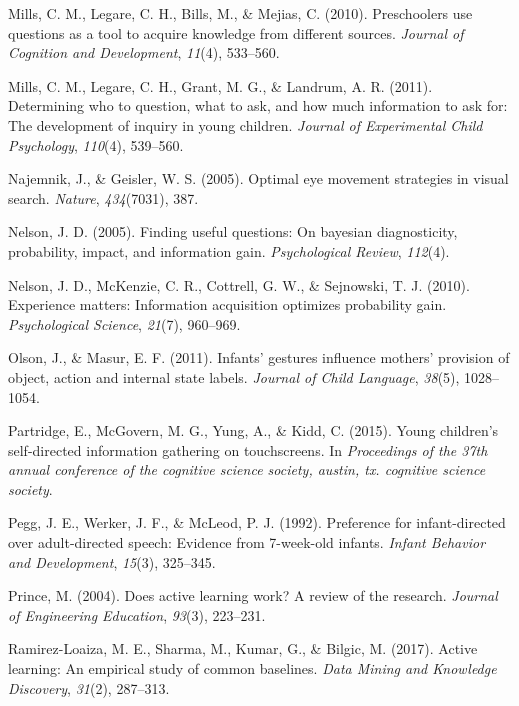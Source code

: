 \documentclass[english,man]{apa6}
\theoremstyle{definition}
\theoremstyle{definition}
\theoremstyle{definition}
\theoremstyle{remark}
\begin{document}
\hypertarget{ref-mills2010preschoolers}{}
Mills, C. M., Legare, C. H., Bills, M., \& Mejias, C. (2010).
Preschoolers use questions as a tool to acquire knowledge from different
sources. \emph{Journal of Cognition and Development}, \emph{11}(4),
533--560.

\hypertarget{ref-mills2011determining}{}
Mills, C. M., Legare, C. H., Grant, M. G., \& Landrum, A. R. (2011).
Determining who to question, what to ask, and how much information to
ask for: The development of inquiry in young children. \emph{Journal of
Experimental Child Psychology}, \emph{110}(4), 539--560.

\hypertarget{ref-najemnik2005optimal}{}
Najemnik, J., \& Geisler, W. S. (2005). Optimal eye movement strategies
in visual search. \emph{Nature}, \emph{434}(7031), 387.

\hypertarget{ref-nelson2005finding}{}
Nelson, J. D. (2005). Finding useful questions: On bayesian
diagnosticity, probability, impact, and information gain.
\emph{Psychological Review}, \emph{112}(4).

\hypertarget{ref-nelson2010experience}{}
Nelson, J. D., McKenzie, C. R., Cottrell, G. W., \& Sejnowski, T. J.
(2010). Experience matters: Information acquisition optimizes
probability gain. \emph{Psychological Science}, \emph{21}(7), 960--969.

\hypertarget{ref-olson2011infants}{}
Olson, J., \& Masur, E. F. (2011). Infants' gestures influence mothers'
provision of object, action and internal state labels. \emph{Journal of
Child Language}, \emph{38}(5), 1028--1054.

\hypertarget{ref-partridge2015young}{}
Partridge, E., McGovern, M. G., Yung, A., \& Kidd, C. (2015). Young
children's self-directed information gathering on touchscreens. In
\emph{Proceedings of the 37th annual conference of the cognitive science
society, austin, tx. cognitive science society}.

\hypertarget{ref-pegg1992preference}{}
Pegg, J. E., Werker, J. F., \& McLeod, P. J. (1992). Preference for
infant-directed over adult-directed speech: Evidence from 7-week-old
infants. \emph{Infant Behavior and Development}, \emph{15}(3), 325--345.

\hypertarget{ref-prince2004does}{}
Prince, M. (2004). Does active learning work? A review of the research.
\emph{Journal of Engineering Education}, \emph{93}(3), 223--231.

\hypertarget{ref-ramirez2017active}{}
Ramirez-Loaiza, M. E., Sharma, M., Kumar, G., \& Bilgic, M. (2017).
Active learning: An empirical study of common baselines. \emph{Data
Mining and Knowledge Discovery}, \emph{31}(2), 287--313.
\end{document}

